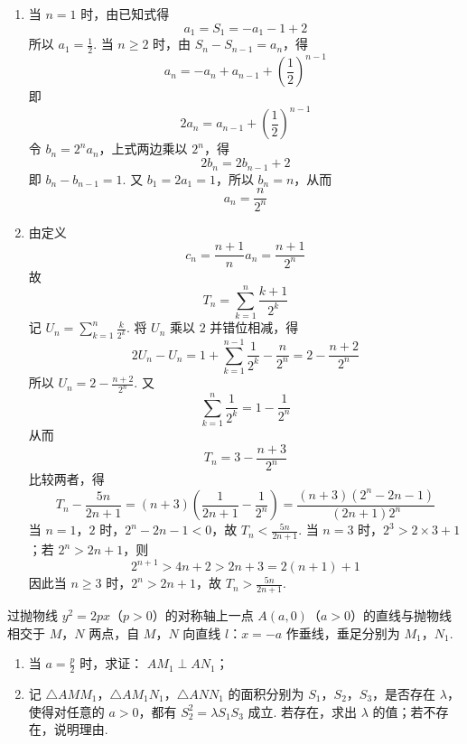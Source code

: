 \begin{solution}
\begin{enumerate}
\item 当 \(n=1\) 时，由已知式得
\[
a_{1}=S_{1}=-a_{1}-1+2
\]
所以 \(a_{1}=\frac12\). 当 \(n\geqslant2\) 时，由 \(S_{n}-S_{n-1}=a_{n}\)，得
\[
a_{n}=-a_{n}+a_{n-1}+\left(\frac12\right)^{n-1}
\]
即
\[
2a_{n}=a_{n-1}+\left(\frac12\right)^{n-1}
\]
令 \(b_{n}=2^{n}a_{n}\)，上式两边乘以 \(2^{n}\)，得
\[
2b_{n}=2b_{n-1}+2
\]
即 \(b_{n}-b_{n-1}=1\). 又 \(b_{1}=2a_{1}=1\)，所以 \(b_{n}=n\)，从而
\[
a_{n}=\frac{n}{2^{n}}
\]

\item 由定义
\[
c_{n}=\frac{n+1}{n}a_{n}=\frac{n+1}{2^{n}}
\]
故
\[
T_{n}=\sum_{k=1}^{n}\frac{k+1}{2^{k}}
\]
记 \(U_{n}=\sum_{k=1}^{n}\frac{k}{2^{k}}\). 将 \(U_n\) 乘以 \(2\) 并错位相减，得
\[
2U_{n}-U_{n}=1+\sum_{k=1}^{n-1}\frac{1}{2^{k}}-\frac{n}{2^{n}}
=2-\frac{n+2}{2^{n}}
\]
所以 \(U_{n}=2-\frac{n+2}{2^{n}}\). 又
\[
\sum_{k=1}^{n}\frac{1}{2^{k}}=1-\frac{1}{2^{n}}
\]
从而
\[
T_{n}=3-\frac{n+3}{2^{n}}
\]
比较两者，得
\[
T_{n}-\frac{5n}{2n+1}
=(n+3)\left(\frac{1}{2n+1}-\frac{1}{2^{n}}\right)
=\frac{(n+3)\left(2^{n}-2n-1\right)}{(2n+1)2^{n}}
\]
当 \(n=1\)，\(2\) 时，\(2^{n}-2n-1<0\)，故 \(T_{n}<\frac{5n}{2n+1}\). 当 \(n=3\) 时，\(2^{3}>2\times3+1\)；若 \(2^{n}>2n+1\)，则
\[
2^{n+1}>4n+2>2n+3=2(n+1)+1
\]
因此当 \(n\geqslant3\) 时，\(2^{n}>2n+1\)，故 \(T_{n}>\frac{5n}{2n+1}\).
\end{enumerate}
\end{solution}

\begin{problem}
过抛物线 \(y^{2} = 2px\)（\(p > 0\)）的对称轴上一点 \(A(a,0)\)（\(a > 0\)）的直线与抛物线相交于 \(M\)，\(N\) 两点，自 \(M\)，\(N\) 向直线 \(l\)：\(x = -a\) 作垂线，垂足分别为 \(M_{1}\)，\(N_{1}\).

\begin{enumerate}
\item 当 \(a = \frac{p}{2}\) 时，求证： \(AM_{1} \perp AN_{1}\)；
\item 记 \(\triangle AMM_{1}\)，\(\triangle AM_{1}N_{1}\)，\(\triangle ANN_{1}\) 的面积分别为 \(S_{1}\)，\(S_{2}\)，\(S_{3}\)，是否存在 \(\lambda\)，使得对任意的 \(a > 0\)，都有 \(S_{2}^{2} = \lambda S_{1}S_{3}\) 成立. 若存在，求出 \(\lambda\) 的值；若不存在，说明理由.
\end{enumerate}
\end{problem}

